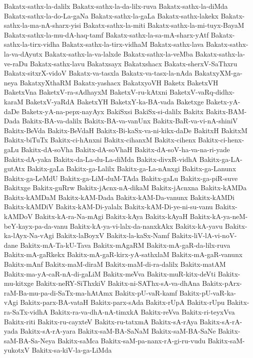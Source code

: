 {Bakatx-sathx-la-dalilx
Bakatx-sathx-la-da-lilx-ruva
Bakatx-sathx-la-diMda
Bakatx-sathx-la-do-La-gaNa
Bakatx-sathx-la-gaLa
Bakatx-sathx-lakekx
Bakatx-sathx-la-ma-nA-sharx-yisi
Bakatx-sathx-la-miti
Bakatx-sathx-la-mi-tuyx-BayaM
Bakatx-sathx-la-mu-dA-haq-tamf
Bakatx-sathx-la-sa-mA-sharx-yAtf
Bakatx-sathx-la-tirx-vidha
Bakatx-sathx-la-tirx-vidhaM
Bakatx-sathx-lava
Bakatx-sathx-la-va-dAyutx
Bakatx-sathx-la-va-lalxde
Bakatx-sathx-la-veMba
Bakatx-sathx-la-ve-raDu
Bakatx-sathx-lavu
Bakatxsayx
Bakatxshacx
Bakatx-sherxV-SaThxru
Bakatx-sitxrX-vidoV
Bakatx-va-tasxla
Bakatx-va-tasx-la-nAda
BakatxyXM-ga-neya
BakatxyXthaRM
Bakatx-yashacx
BakatxyoVH
Baketx
BaketxVH
BaketxVna
BaketxV-ra-sAdhayxM
BaketxV-ru-kAtxni
BaketxV-vaRq-didhx-karaM
BaketxV-yaRdA
BaketxYH
BaketxY-ka-BA-vada
Baketxge
Baketx-yA-daDe
Baketx-yA-na-pepx-nayAyx
BakiSxsi
BakiSx-si-dalilx
Bakitx
Bakitx-BAM-Dada
Bakitx-BA-va-dalilx
Bakitx-BA-va-vanUnx
Bakitx-BaR-va-vi-nA-shiniV
Bakitx-BeVda
Bakitx-BeVdaH
Bakitx-Bi-kaSx-va-ni-kikx-daDe
BakitxH
BakitxM
Bakitx-biTuTx
Bakitx-ci-hAnxni
Bakitx-cihanxM
Bakitx-cihenx
Bakitx-ci-henx-gaLu
Bakitx-dA-soVha
Bakitx-dA-soVhaH
Bakitx-dA-soV-ha-va-na-ri-yade
Bakitx-dA-yaka
Bakitx-da-La-du-La-diMda
Bakitx-divxR-vidhA
Bakitx-ga-LA-gutAtx
Bakitx-gaLa
Bakitx-ga-Lalilx
Bakitx-ga-La-nAnxgi
Bakitx-ga-Lanunx
Bakitx-ga-LeMdU
Bakitx-ga-LiM-duM-TAda
Bakitx-gaLu
Bakitx-ga-piR-suve
Bakitxge
Bakitx-guRrw
Bakitx-jAcnx-nA-dikaM
Bakitx-jAcnxna
Bakitx-kAMDa
Bakitx-kAMDaM
Bakitx-kAM-Dada
Bakitx-kAM-Da-vanunx
Bakitx-kAMDi
Bakitx-kAMDiV
Bakitx-kAM-Di-yalalx
Bakitx-kAM-Di-ye-ni-su-vanu
Bakitx-kAMDoV
Bakitx-kA-ra-Na-mAgi
Bakitx-kAya
Bakitx-kAyaH
Bakitx-kA-ya-neM-beY-kayx-pa-da-vanu
Bakitx-kA-ya-vi-lalx-da-nanxkAkx
Bakitx-kA-yavu
Bakitx-ka-lAyx-Na-vAgi
Bakitx-laBoyxV
Bakitx-la-kaSx-Namf
Bakitx-liV-lA-vi-noV-dane
Bakitx-mA-Ta-kU-Tava
Bakitx-mAgaRM
Bakitx-mA-gaR-da-lilx-ruva
Bakitx-mA-gaRkekx
Bakitx-mA-gaR-kirx-yA-sathxlaM
Bakitx-mA-gaR-vanunx
Bakitx-mAnf
Bakitx-maM-diraM
Bakitx-maM-di-ra-dalilx
Bakitx-matAM
Bakitx-ma-yA-caR-nA-di-gaLiM
Bakitx-meVva
Bakitx-muR-kitx-deVti
Bakitx-mu-kitxge
Bakitx-neRY-SiThxkiV
Bakitx-ni-SAThx-sA-va-dhAna
Bakitx-pArx-raM-Ba-mu-pa-di-SaTx-ma-hAtAmx
Bakitx-pU-vaR-kamf
Bakitx-pU-vaR-ka-vAgi
Bakitx-parx-BA-vataH
Bakitx-parx-sAda
Bakitx-rUpA
Bakitx-rUpu
Bakitx-ra-SaTx-vidhA
Bakitx-ra-va-dhA-nA-timxkA
Bakitx-reVva
Bakitx-ri-teyxVva
Bakitx-riti
Bakitx-ru-cayxteV
Bakitx-ru-tatxmA
Bakitx-sA-rAya
Bakitx-sA-rA-yada
Bakitx-sA-rA-yara
Bakitx-saM-BA-SaNaM
Bakitx-saM-BA-SaNe
Bakitx-saM-BA-Sa-Neya
Bakitx-saMca
Bakitx-saM-pa-nanx-rA-gi-ru-vudu
Bakitx-saM-yukotxV
Bakitx-sa-kiV-la-ga-LiMda
}
